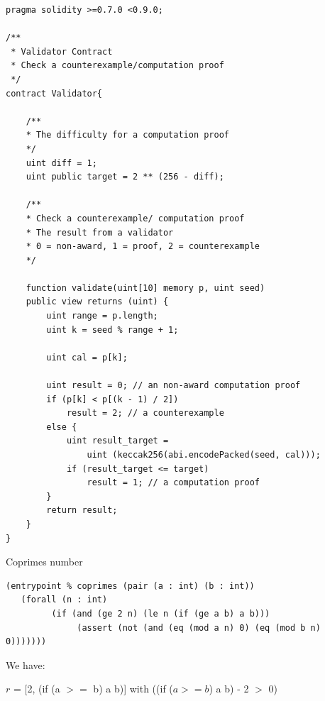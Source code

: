 \documentclass[runningheads]{llncs}
\begin{document}
\begin{lstlisting}[numbers=none]
pragma solidity >=0.7.0 <0.9.0;

/**
 * Validator Contract
 * Check a counterexample/computation proof
 */
contract Validator{

    /**
    * The difficulty for a computation proof
    */
    uint diff = 1;
    uint public target = 2 ** (256 - diff); 

    /**
    * Check a counterexample/ computation proof
    * The result from a validator
    * 0 = non-award, 1 = proof, 2 = counterexample
    */

    function validate(uint[10] memory p, uint seed) 
    public view returns (uint) {
        uint range = p.length; 
        uint k = seed % range + 1;

        uint cal = p[k];

        uint result = 0; // an non-award computation proof 
        if (p[k] < p[(k - 1) / 2])  
            result = 2; // a counterexample
        else {
            uint result_target = 
                uint (keccak256(abi.encodePacked(seed, cal)));
            if (result_target <= target) 
                result = 1; // a computation proof      
        }              
        return result;           
    }
}

\end{lstlisting}

Coprimes number

\begin{lstlisting}[numbers=none]
(entrypoint % coprimes (pair (a : int) (b : int))
   (forall (n : int)
         (if (and (ge 2 n) (le n (if (ge a b) a b)))
              (assert (not (and (eq (mod a n) 0) (eq (mod b n) 0)))))))
\end{lstlisting}


\noindent We have:

$r$ = [2, (if (a $>=$ b) a b)] with ((if ($a >= b$) a b) - 2 $>$ 0)
\end{document}
